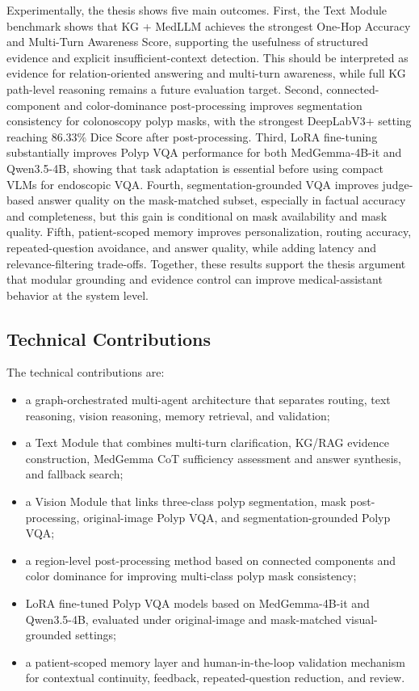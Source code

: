 Experimentally, the thesis shows five main outcomes. First, the Text Module benchmark shows that KG + MedLLM achieves the strongest One-Hop Accuracy and Multi-Turn Awareness Score, supporting the usefulness of structured evidence and explicit insufficient-context detection. This should be interpreted as evidence for relation-oriented answering and multi-turn awareness, while full KG path-level reasoning remains a future evaluation target. Second, connected-component and color-dominance post-processing improves segmentation consistency for colonoscopy polyp masks, with the strongest DeepLabV3+ setting reaching 86.33\% Dice Score after post-processing. Third, LoRA fine-tuning substantially improves Polyp VQA performance for both MedGemma-4B-it and Qwen3.5-4B, showing that task adaptation is essential before using compact VLMs for endoscopic VQA. Fourth, segmentation-grounded VQA improves judge-based answer quality on the mask-matched subset, especially in factual accuracy and completeness, but this gain is conditional on mask availability and mask quality. Fifth, patient-scoped memory improves personalization, routing accuracy, repeated-question avoidance, and answer quality, while adding latency and relevance-filtering trade-offs. Together, these results support the thesis argument that modular grounding and evidence control can improve medical-assistant behavior at the system level.

\subsection{Technical Contributions}

The technical contributions are:

\begin{itemize}
    \item a graph-orchestrated multi-agent architecture that separates routing, text reasoning, vision reasoning, memory retrieval, and validation;
    \item a Text Module that combines multi-turn clarification, KG/RAG evidence construction, MedGemma CoT sufficiency assessment and answer synthesis, and fallback search;
    \item a Vision Module that links three-class polyp segmentation, mask post-processing, original-image Polyp VQA, and segmentation-grounded Polyp VQA;
    \item a region-level post-processing method based on connected components and color dominance for improving multi-class polyp mask consistency;
    \item LoRA fine-tuned Polyp VQA models based on MedGemma-4B-it and Qwen3.5-4B, evaluated under original-image and mask-matched visual-grounded settings;
    \item a patient-scoped memory layer and human-in-the-loop validation mechanism for contextual continuity, feedback, repeated-question reduction, and review.
\end{itemize}

